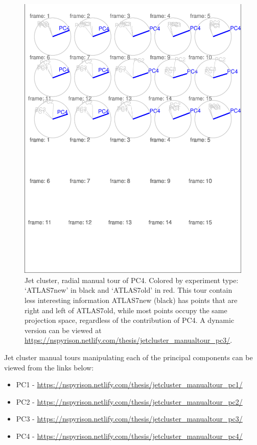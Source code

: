\documentclass{monashthesis}
\begin{document}
\begin{figure}
\centering
\includegraphics{thesis_files/figure-latex/JetClusterBad-1.pdf}
\caption{\label{fig:JetClusterBad}Jet cluster, radial manual tour of PC4.
Colored by experiment type: `ATLAS7new' in black and `ATLAS7old' in red.
This tour contain less interesting information ATLAS7new (black) has
points that are right and left of ATLAS7old, while most points occupy
the same projection space, regardless of the contribution of PC4. A
dynamic version can be viewed at
\url{https://nspyrison.netlify.com/thesis/jetcluster_manualtour_pc3/}.}
\end{figure}

Jet cluster manual tours manipulating each of the principal components
can be viewed from the links below:

\begin{itemize}
\tightlist
\item
  PC1 -
  \url{https://nspyrison.netlify.com/thesis/jetcluster_manualtour_pc1/}
\item
  PC2 -
  \url{https://nspyrison.netlify.com/thesis/jetcluster_manualtour_pc2/}
\item
  PC3 -
  \url{https://nspyrison.netlify.com/thesis/jetcluster_manualtour_pc3/}
\item
  PC4 -
  \url{https://nspyrison.netlify.com/thesis/jetcluster_manualtour_pc4/}
\end{itemize}
\end{document}
